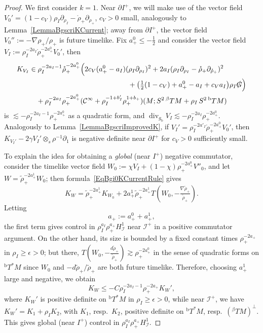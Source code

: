 \documentclass[reqno,11pt,letterpaper]{amsart}
\numberwithin{equation}{section}
\numberwithin{figure}{section}
\theoremstyle{definition}
\theoremstyle{remark}
\newcommand{\mc}{\mathcal}
\newcommand{\cC}{\mc C}
\newcommand{\ms}{\mathscr}
\newcommand{\scri}{\ms I}
\newcommand{\slG}{\slashed{G}{}}
\newcommand{\ringrho}{\mathring\rho}
\newcommand{\dv}{\operatorname{div}}
\newcommand{\eps}{\epsilon}
\newcommand{\pa}{\partial}
\newcommand{\wt}{\widetilde}
\newcommand{\bop}{{\mathrm{b}}}
\newcommand{\Tb}{{}^{\bop}T}
\newcommand{\Tbeta}{{}^{\beta}T}
\newcommand{\half}{\tfrac{1}{2}}
\newcommand{\CI}{\cC^\infty}
\newcommand{\Hscri}{H_{\scri}}
\begin{document}
\begin{proof}
  We first consider $k=1$. Near $\pa I^+$, we will make use of the vector field $V_0'=(1-c_V)\rho_I\pa_{\rho_I}-\ringrho_+\pa_{\ringrho_+}$, $c_V>0$ small, analogously to Lemma~\ref{LemmaBgscriKCurrent}; away from $\pa I^+$, the vector field $V_0'':=-\nabla\rho_+/\rho_+$ is future timelike. Fix $a^0_+\leq-\half$ and consider the vector field $V_I:=\rho_I^{-2 a_I}\ringrho_+^{-2 a^0_+}V_0'$, then
  \begin{align*}
    K_{V_I} &\in \rho_I^{-2 a_I-1}\ringrho_+^{-2 a^0_+}\Bigl(2 c_V(a^0_+-a_I)(\rho_I\pa_{\rho_I})^2 + 2 a_I(\rho_I\pa_{\rho_I}-\ringrho_+\pa_{\ringrho_+})^2 \\
      &\hspace{14em} + \bigl(\half(1-c_V)+a^0_+-a_I + c_V a_I\bigr)\rho_I\slG \Bigr) \\
      &\quad + \rho_I^{-2 a_I}\rho_+^{-2 a^0_+}(\CI+\rho_I^{-1+b'_I}\rho_+^{1+b_+})(M;S^2\,\Tbeta M+\rho_I\,S^2\,\Tb M)
  \end{align*}
  is $\lesssim -\rho_I^{-2 a_I-1}\rho_+^{-2 a^0_+}$ as a quadratic form, and $\dv_{g_\bop} V_I\lesssim -\rho_I^{-2 a_I}\rho_+^{-2 a^0_+}$. Analogously to Lemma~\ref{LemmaBgscriImprovedK}, if $V_I'=\rho_I^{-2 a'_I}\ringrho_+^{-2 a_+^0}V_0'$, then $K_{V_I'}-2\gamma V_I'\otimes_s\rho^{-1}\pa_1$ is negative definite near $\pa I^+$ for $c_V>0$ sufficiently small.

  To explain the idea for obtaining a \emph{global} (near $I^+$) negative commutator, consider the timelike vector field $W_0:=\chi V_I+(1-\chi)\rho_+^{-2 a_+^0}V''_0$, and let $W=\wt\rho_+^{-2 a_+^1}W_0$; then formula~\eqref{EqBgi0KCurrentRule} gives
  \begin{equation}
  \label{EqBgi0Weight}
    K_W = \wt\rho_+^{-2 a_+^1}K_{W_0} + 2 a_+^1\wt\rho_+^{-2 a_+^1} T(W_0,-\tfrac{\nabla\wt\rho_+}{\wt\rho_+}).
  \end{equation}
  Letting
  \[
    a_+:=a_+^0+a_+^1,
  \]
  the first term gives control in $\rho_I^{a_I}\rho_+^{a_+}\Hscri^1$ near $\scri^+$ in a positive commutator argument. On the other hand, its size is bounded by a fixed constant times $\rho_+^{-2 a_+}$ in $\rho_I\geq\eps>0$; but there, $T(W_0,-\tfrac{d\wt\rho_+}{\wt\rho_+})\gtrsim \rho_+^{-2 a_+^0}$ in the sense of quadratic forms on $\Tb^*M$ since $W_0$ and $-d\wt\rho_+/\wt\rho_+$ are both future timelike. Therefore, choosing $a_+^1$ large and negative, we obtain
  \[
    K_W \leq -C\rho_I^{-2 a_I-1}\rho_+^{-2 a_+}K_W',
  \]
  where $K_W'$ is positive definite on $\Tb^*M$ in $\rho_I\geq\eps>0$, while near $\scri^+$, we have $K_W'=K_1+\rho_I K_2$, with $K_1$, resp.\ $K_2$, positive definite on $\Tb^*M$, resp.\ $(\Tbeta M)^\perp$. This gives global (near $I^+$) control in $\rho_I^{a_I}\rho_+^{a_+}\Hscri^1$.
  

\end{proof}
\end{document}
